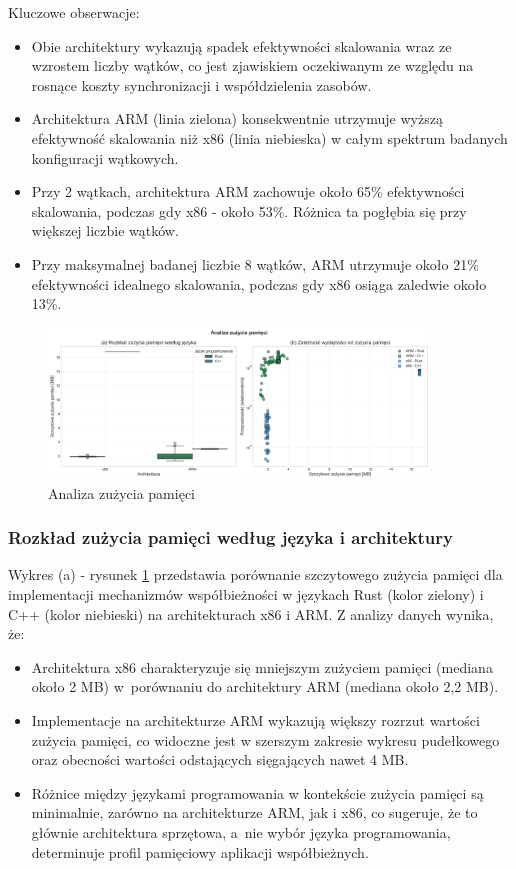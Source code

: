Kluczowe obserwacje:
\begin{itemize}
    \item Obie architektury wykazują spadek efektywności skalowania wraz ze wzrostem liczby wątków, co jest zjawiskiem oczekiwanym ze względu na rosnące koszty synchronizacji i współdzielenia zasobów.
    \item Architektura ARM (linia zielona) konsekwentnie utrzymuje wyższą efektywność skalowania niż x86 (linia niebieska) w całym spektrum badanych konfiguracji wątkowych.
    \item Przy 2 wątkach, architektura ARM zachowuje około 65\% efektywności skalowania, podczas gdy x86 - około 53\%. Różnica ta pogłębia się przy większej liczbie wątków.
    \item Przy maksymalnej badanej liczbie 8 wątków, ARM utrzymuje około 21\% efektywności idealnego skalowania, podczas gdy x86 osiąga zaledwie około 13\%.
\end{itemize}

\begin{figure}[H]
    \centering
    \includegraphics[width=0.9\textwidth]{analiza/images/conc/pc/compare/rysunek_3_zuzycie_pamieci.png}
    \caption{Analiza zużycia pamięci}
    \label{rysunek_3_zuzycie_pamieci}
\end{figure}

\subsubsection{Rozkład zużycia pamięci według języka i architektury}
Wykres (a) - rysunek \ref{rysunek_3_zuzycie_pamieci} przedstawia porównanie szczytowego zużycia pamięci dla implementacji mechanizmów współbieżności w językach Rust (kolor zielony) i C++ (kolor niebieski) na architekturach x86 i ARM. Z analizy danych wynika, że:
\begin{itemize}
    \item Architektura x86 charakteryzuje się mniejszym zużyciem pamięci (mediana około 2 MB) w~porównaniu do architektury ARM (mediana około 2,2 MB).
    \item Implementacje na architekturze ARM wykazują większy rozrzut wartości zużycia pamięci, co widoczne jest w szerszym zakresie wykresu pudełkowego oraz obecności wartości odstających sięgających nawet 4 MB.
    \item Różnice między językami programowania w kontekście zużycia pamięci są minimalnie, zarówno na architekturze ARM, jak i x86, co sugeruje, że to głównie architektura sprzętowa, a~nie wybór języka programowania, determinuje profil pamięciowy aplikacji współbieżnych.
\end{itemize}

